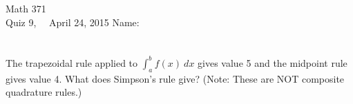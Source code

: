 \documentclass[addpoints, 11pt]{exam}
\newcommand{\ds}{\displaystyle}
\begin{document}
Math 371 \\
Quiz 9, \ \ April 24, 2015
\hspace{2.in}
{Name:} {\underline {\hspace{2.15in}}} \\ \normalsize
\ \\ \ \\

The trapezoidal rule applied to $\ds \int_a^b f(x)~dx$ gives value 5 and the midpoint rule gives value 4. What does Simpson's rule give?  (Note: These are NOT composite quadrature rules.)
\end{document}
